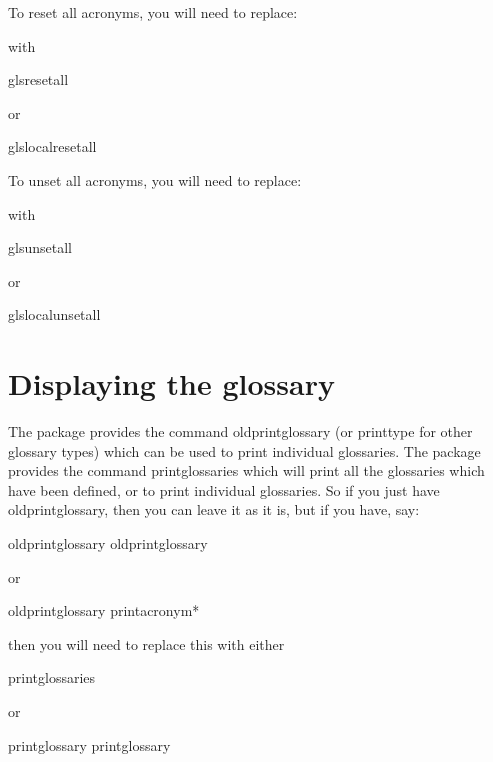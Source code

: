 \documentclass[titlepage=false,oneside,
 fontsize=12pt,captions=tableheading]{scrarticle}
\newenvironment{oldway}
{\begin{codebox*}[title={\styfmt{glossary.sty}}]}
{\end{codebox*}}
\newenvironment{newway}
{\begin{codebox*}[title={\styfmt{glossaries.sty}}]}
{\end{codebox*}}
\begin{document}
To reset all acronyms, you will need to replace:
\begin{oldway}
\end{oldway}
with
\begin{newway}
\gls{glsresetall}
\end{newway}
or
\begin{newway}
\gls{glslocalresetall}
\end{newway}
To unset all acronyms, you will need to replace:
\begin{oldway}
\end{oldway}
with
\begin{newway}
\gls{glsunsetall}
\end{newway}
or
\begin{newway}
\gls{glslocalunsetall}
\end{newway}

\section{Displaying the glossary}
\label{sec:printgloss}

The  package provides the command \gls{oldprintglossary}
(or \gls{printtype} for other glossary types) which
can be used to print individual glossaries. The 
package provides the command \gls{printglossaries} which 
will print all the glossaries which have been defined, or
 to print individual glossaries.
So if you just have \gls{oldprintglossary}, then you can leave it as
it is, but if you have, say:
\begin{oldway}
\gls{oldprintglossary}
\gls{oldprintglossary}
\end{oldway}
or
\begin{oldway}
\gls{oldprintglossary}
\gls{printacronym}*
\end{oldway}
then you will need to replace this with either
\begin{newway}
\gls{printglossaries}
\end{newway}
or 
\begin{newway}
\gls{printglossary}
\gls{printglossary}
\end{newway}
\end{document}
